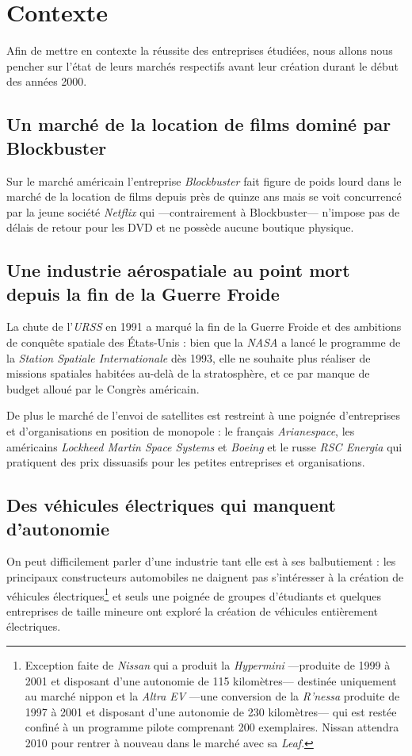 \chapter{Contexte}

Afin de mettre en contexte la réussite des entreprises étudiées, nous allons nous pencher sur l'état de leurs marchés respectifs avant leur création durant le début des années 2000.

\section{Un marché de la location de films dominé par Blockbuster}

Sur le marché américain l'entreprise \textit{Blockbuster} fait figure de poids lourd dans le marché de la location de films depuis près de quinze ans mais se voit concurrencé par la jeune société \textit{Netflix} qui ---contrairement à Blockbuster--- n'impose pas de délais de retour pour les DVD et ne possède aucune boutique physique. 

\section{Une industrie aérospatiale au point mort depuis la fin de la Guerre Froide}

La chute de l'\textit{URSS} en 1991 a marqué la fin de la Guerre Froide et des ambitions de conquête spatiale des États-Unis : bien que la \textit{NASA} a lancé le programme de la \textit{Station Spatiale Internationale} dès 1993, elle ne souhaite plus réaliser de missions spatiales habitées au-delà de la stratosphère, et ce par manque de budget alloué par le Congrès américain. 

De plus le marché de l'envoi de satellites est restreint à une poignée d'entreprises et d'organisations en position de monopole : le français \textit{Arianespace}, les américains \textit{Lockheed Martin Space Systems} et \textit{Boeing} et le russe \textit{RSC Energia} qui pratiquent des prix dissuasifs pour les petites entreprises et organisations.

\section{Des véhicules électriques qui manquent d'autonomie}

On peut difficilement parler d'une industrie tant elle est à ses balbutiement : les principaux constructeurs automobiles ne daignent pas s'intéresser à la création de véhicules électriques\footnote{Exception faite de \textit{Nissan} qui a produit la \textit{Hypermini} ---produite de 1999 à 2001 et disposant d'une autonomie de 115 kilomètres--- destinée uniquement au marché nippon et la \textit{Altra EV} ---une conversion de la \textit{R'nessa} produite de 1997 à 2001 et disposant d'une autonomie de 230 kilomètres--- qui est restée confiné à un programme pilote comprenant 200 exemplaires. Nissan attendra 2010 pour rentrer à nouveau dans le marché avec sa \textit{Leaf}.} et seuls une poignée de groupes d'étudiants et quelques entreprises de taille mineure ont exploré la création de véhicules entièrement électriques.

